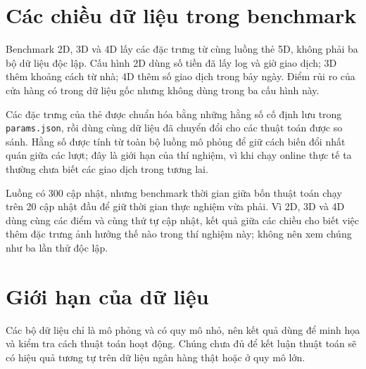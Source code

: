 \section{Các chiều dữ liệu trong benchmark}

Benchmark 2D, 3D và 4D lấy các đặc trưng từ cùng luồng thẻ 5D, không phải ba bộ dữ liệu độc lập. Cấu hình 2D dùng số tiền đã lấy log và giờ giao dịch; 3D thêm khoảng cách từ nhà; 4D thêm số giao dịch trong bảy ngày. Điểm rủi ro của cửa hàng có trong dữ liệu gốc nhưng không dùng trong ba cấu hình này.

Các đặc trưng của thẻ được chuẩn hóa bằng những hằng số cố định lưu trong \texttt{params.json}, rồi dùng cùng dữ liệu đã chuyển đổi cho các thuật toán được so sánh. Hằng số được tính từ toàn bộ luồng mô phỏng để giữ cách biến đổi nhất quán giữa các lượt; đây là giới hạn của thí nghiệm, vì khi chạy online thực tế ta thường chưa biết các giao dịch trong tương lai.

Luồng có 300 cập nhật, nhưng benchmark thời gian giữa bốn thuật toán chạy trên 20 cập nhật đầu để giữ thời gian thực nghiệm vừa phải. Vì 2D, 3D và 4D dùng cùng các điểm và cùng thứ tự cập nhật, kết quả giữa các chiều cho biết việc thêm đặc trưng ảnh hưởng thế nào trong thí nghiệm này; không nên xem chúng như ba lần thử độc lập.

\section{Giới hạn của dữ liệu}

Các bộ dữ liệu chỉ là mô phỏng và có quy mô nhỏ, nên kết quả dùng để minh họa và kiểm tra cách thuật toán hoạt động. Chúng chưa đủ để kết luận thuật toán sẽ có hiệu quả tương tự trên dữ liệu ngân hàng thật hoặc ở quy mô lớn.

